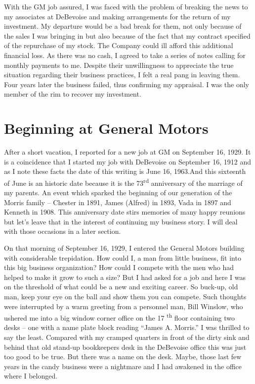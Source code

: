 \documentclass[12pt]{book}              %
\begin{document}
With the GM job assured, I was faced with the problem of breaking the news to my associates at DeBevoise and making arrangements for the return of my investment. My departure would be a bad break for them, not only because of the sales I was bringing in but also because of the fact that my contract specified of the repurchase of my stock. The Company could ill afford this additional financial loss. As there was no cash, I agreed to take a series of notes calling for monthly payments to me. Despite their unwillingness to appreciate the true situation regarding their business practices, I felt a real pang in leaving them. Four years later the business failed, thus confirming my appraisal. I was the only member of the rim to recover my investment.

\chapter{Beginning at General Motors}

After a short vacation, I reported for a new job at GM on September 16, 1929. It is a coincidence that I started my job with DeBevoise on September 16, 1912 and as I note these facts the date of this writing is June 16, 1963.And this sixteenth of June is an historic date because it is the 73\textsuperscript{rd} anniversary of the marriage of my parents. An event which sparked the beginning of our generation of the Morris family -- Chester in 1891, James (Alfred) in 1893, Vada in 1897 and Kenneth in 1908. This anniversary date stirs memories of many happy reunions but let's leave that in the interest of continuing my business story. I will deal with those occasions in a later section. 

On that morning of September 16, 1929, I entered the General Motors building with considerable trepidation. How could I, a man from little business, fit into this big business organization? How could I compete with the men who had helped to make it grow to such a size? But I had asked for a job and here I was on the threshold of what could be a new and exciting career. So buck-up, old man, keep your eye on the ball and show them you can compete. Such thoughts were interrupted by a warm greeting from a personnel man, Bill Winslow, who ushered me into a big window corner office on the 17 \textsuperscript{th} floor containing two desks -- one with a name plate block reading ``James A. Morris.'' I was thrilled to say the least. Compared with my cramped quarters in front of the dirty sink and behind that old stand-up bookkeepers desk in the DeBevoise office this was just too good to be true. But there was a name on the desk. Maybe, those last few years in the candy business were a nightmare and I had awakened in the office where I belonged. 
\end{document}
